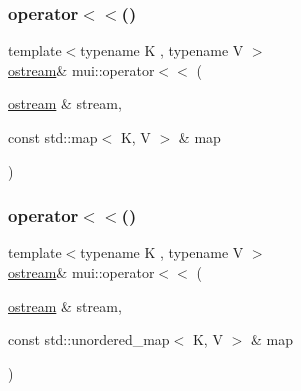 \mbox{\label{namespacemui_a215650389625167f2202a56b91911c08}} 
\subsubsection{\texorpdfstring{operator$<$$<$()}{operator<<()}\hspace{0.1cm}{\footnotesize\ttfamily [3/21]}}
{\footnotesize\ttfamily template$<$typename K , typename V $>$ \\
\hyperlink{classmui_1_1ostream}{ostream}\& mui\+::operator$<$$<$ (\begin{DoxyParamCaption}\item[{\hyperlink{classmui_1_1ostream}{ostream} \&}]{stream,  }\item[{const std\+::map$<$ K, V $>$ \&}]{map }\end{DoxyParamCaption})\hspace{0.3cm}{\ttfamily [inline]}}

\mbox{\label{namespacemui_aae82cad4a3539e32a59b1fa178a374d4}} 
\subsubsection{\texorpdfstring{operator$<$$<$()}{operator<<()}\hspace{0.1cm}{\footnotesize\ttfamily [4/21]}}
{\footnotesize\ttfamily template$<$typename K , typename V $>$ \\
\hyperlink{classmui_1_1ostream}{ostream}\& mui\+::operator$<$$<$ (\begin{DoxyParamCaption}\item[{\hyperlink{classmui_1_1ostream}{ostream} \&}]{stream,  }\item[{const std\+::unordered\+\_\+map$<$ K, V $>$ \&}]{map }\end{DoxyParamCaption})\hspace{0.3cm}{\ttfamily [inline]}}

\mbox{\label{namespacemui_a53dd1ab5a10e8b488256e61cd2f66860}} 
